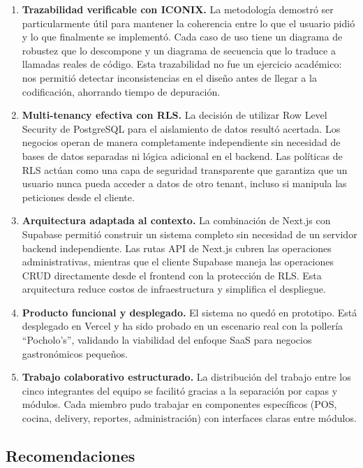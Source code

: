 \documentclass[12pt, a4paper]{article}
\begin{document}
\begin{enumerate}[leftmargin=2cm]
    \item \textbf{Trazabilidad verificable con ICONIX.} La metodología demostró ser particularmente útil para mantener la coherencia entre lo que el usuario pidió y lo que finalmente se implementó. Cada caso de uso tiene un diagrama de robustez que lo descompone y un diagrama de secuencia que lo traduce a llamadas reales de código. Esta trazabilidad no fue un ejercicio académico: nos permitió detectar inconsistencias en el diseño antes de llegar a la codificación, ahorrando tiempo de depuración.

    \item \textbf{Multi-tenancy efectiva con RLS.} La decisión de utilizar Row Level Security de PostgreSQL para el aislamiento de datos resultó acertada. Los negocios operan de manera completamente independiente sin necesidad de bases de datos separadas ni lógica adicional en el backend. Las políticas de RLS actúan como una capa de seguridad transparente que garantiza que un usuario nunca pueda acceder a datos de otro tenant, incluso si manipula las peticiones desde el cliente.

    \item \textbf{Arquitectura adaptada al contexto.} La combinación de Next.js con Supabase permitió construir un sistema completo sin necesidad de un servidor backend independiente. Las rutas API de Next.js cubren las operaciones administrativas, mientras que el cliente Supabase maneja las operaciones CRUD directamente desde el frontend con la protección de RLS. Esta arquitectura reduce costos de infraestructura y simplifica el despliegue.

    \item \textbf{Producto funcional y desplegado.} El sistema no quedó en prototipo. Está desplegado en Vercel y ha sido probado en un escenario real con la pollería ``Pocholo's'', validando la viabilidad del enfoque SaaS para negocios gastronómicos pequeños.

    \item \textbf{Trabajo colaborativo estructurado.} La distribución del trabajo entre los cinco integrantes del equipo se facilitó gracias a la separación por capas y módulos. Cada miembro pudo trabajar en componentes específicos (POS, cocina, delivery, reportes, administración) con interfaces claras entre módulos.
\end{enumerate}

\subsection{Recomendaciones}
\end{document}
